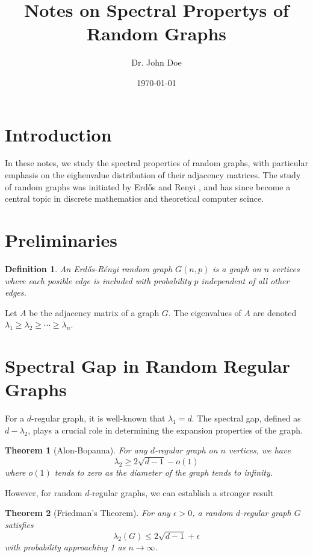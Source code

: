\documentclass[12pt,a4paper]{article}
\title{Notes on Spectral Propertys of Random Graphs}
\author{Dr. John Doe}
\date{\today}
\newtheorem{theorem}{Theorem}
\newtheorem{definition}{Definition}
\begin{document}
\maketitle

\section{Introduction}
In these notes, we study the spectral properties of random graphs, with particular emphasis on the eighenvalue distribution of their adjacency matrices. The study of random graphs was initiated by Erdős and Renyi \cite{erdos1960evolution}, and has since become a central topic in discrete mathematics and theoretical computer scince.

\section{Preliminaries}
\begin{definition}
    An Erdős-Rényi random graph $G(n,p)$ is a graph on $n$ vertices where each posible edge is included with probability $p$ independent of all other edges.
\end{definition}

Let $A$ be the adjacency matrix of a graph $G$. The eigenvalues of $A$ are denoted $\lambda_1 \geq \lambda_2 \geq \cdots \geq \lambda_n$.

\section{Spectral Gap in Random Regular Graphs}
For a $d$-regular graph, it is well-known that $\lambda_1 = d$. The spectral gap, defined as $d - \lambda_2$, plays a crucial role in determining the expansion properties of the graph.

\begin{theorem}[Alon-Bopanna]
    For any $d$-regular graph on $n$ vertices, we have
    \begin{equation}
        \lambda_2 \geq 2\sqrt{d-1} - o(1)
    \end{equation}
    where $o(1)$ tends to zero as the diameter of the graph tends to infinity.
\end{theorem}

However, for random $d$-regular graphs, we can establish a stronger result

\begin{theorem}[Friedman's Theorem]
    For any $\epsilon > 0$, a random $d$-regular graph $G$ satisfies
    \begin{equation}
        \lambda_2(G) \leq 2\sqrt{d-1} + \epsilon
    \end{equation}
    with probability approaching 1 as $n \to \infty$.
\end{theorem}
\end{document}
